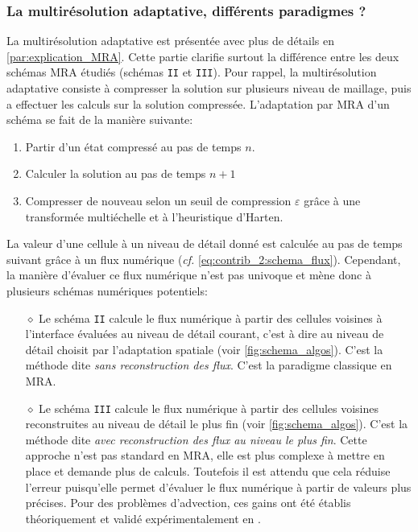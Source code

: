         \subsubsection{La multirésolution adaptative, différents paradigmes ?}\label{par:paradigme_MRA}
            La multirésolution adaptative est présentée avec plus de détails en \ref{par:explication_MRA}.    
            Cette partie clarifie surtout la différence entre les deux schémas MRA étudiés (schémas \texttt{II} et \texttt{III}).
            Pour rappel, la multirésolution adaptative consiste à compresser la solution sur plusieurs niveau de maillage,
            puis a effectuer les calculs sur la solution compressée.
            L'adaptation par MRA d'un schéma se fait de la manière suivante:
            \begin{enumerate}
                \item Partir d'un état compressé au pas de temps $n$.
                \item Calculer la solution au pas de temps $n+1$
                \item Compresser de nouveau selon un seuil de compression $\varepsilon$ grâce à une transformée multiéchelle et à l'heuristique d'Harten.
            \end{enumerate}
            La valeur d'une cellule à un niveau de détail donné est calculée au pas de temps suivant
            grâce à un flux numérique (\emph{cf.} \eqref{eq:contrib_2:schema_flux}). 
            Cependant, la manière d'évaluer ce flux numérique n'est pas univoque et mène donc à plusieurs schémas numériques potentiels:
            \begin{itemize}
                \item[$\diamond$] Le schéma \texttt{II} calcule le flux numérique
                à partir des cellules voisines à l'interface évaluées au niveau de détail courant, c'est à dire au niveau de détail choisit par l'adaptation spatiale (voir \ref{fig:schema_algos}). 
                C'est la méthode dite \textit{sans reconstruction des flux}. C'est la paradigme classique en MRA.
                \item[$\diamond$] Le schéma \texttt{III} calcule le flux numérique 
                à partir des cellules voisines reconstruites au niveau de détail le plus fin (voir \ref{fig:schema_algos}). C'est la méthode dite \textit{avec reconstruction des flux au niveau le plus fin}.
                Cette approche n'est pas standard en MRA, elle est plus complexe à mettre en place et demande plus de calculs.
                Toutefois il est attendu que cela réduise l'erreur puisqu'elle permet d'évaluer le flux numérique à partir de valeurs plus précises.
                Pour des problèmes d'advection, ces gains ont été établis théoriquement et validé expérimentalement en \cite{belloti_et_al_2025,Massot2025_meshAdaptation}.
            \end{itemize}
